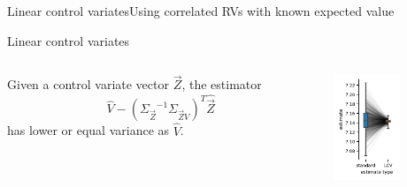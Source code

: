 \documentclass[9pt]{beamer}
\newcommand{\T}{T}
\newcommand{\bottomcite}[1]{\vspace*{\fill} {\scriptsize \parencite{#1}}}
\begin{document}
\begin{frame}{Linear control variates}{Using correlated RVs with known expected value}
\begin{block}{Linear control variates}
        \begin{columns}
            \begin{column}{.6\textwidth}
                Given a control variate vector $\vec{Z}$, the estimator
                \[\hat{V} -({\Sigma_{ \vec{Z}}}^{-1}{\Sigma}_{ \vec{Z} V})^{\T}{\hat{\vec{Z}}} \]
                has lower or equal variance as $\hat{V}$.
            \end{column}
            \begin{column}{.2\textwidth}
                \includegraphics[width=20mm]{../gfx/adjustment_trans.pdf}
            \end{column}
        \end{columns}
    \end{block}
    \bottomcite{backenkohler2019control}
\end{frame}
\end{document}
